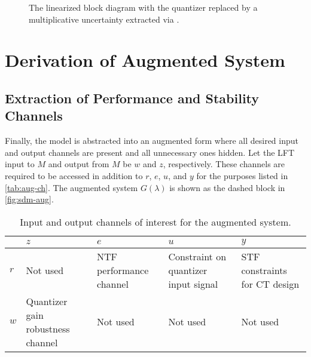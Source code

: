 \begin{figure}[h]
\begin{tikzpicture}[ampersand replacement=\&,scale=0.75, every node/.style={scale=0.75}]
	\end{tikzpicture}
	\caption{The linearized block diagram with the quantizer replaced by a multiplicative uncertainty extracted via .} \label{fig:sdm-stdf-lft}
\end{figure}

\section{Derivation of Augmented System}

\subsection{Extraction of Performance and Stability Channels}

Finally, the model is abstracted into an augmented form where all desired input and output channels are present and all unnecessary ones hidden. Let the \gls{LFT} input to $M$ and output from $M$ be $w$ and $z$, respectively. These channels are required to be accessed in addition to $r$, $e$, $u$, and $y$ for the purposes listed in \autoref{tab:aug-ch}. The augmented system $G(\lambda)$ is shown as the dashed block in \autoref{fig:sdm-aug}.

\begin{table}[t]
	\caption{Input and output channels of interest for the augmented system.} \label{tab:aug-ch}
	\begin{tabular}{l | >{\RaggedRight}p{2cm} >{\RaggedRight}p{2.25cm} >{\RaggedRight}p{2.25cm} >{\RaggedRight}p{2cm}}
		\toprule
		\diagbox[width=2cm, height=1cm]{\textbf{Input}}{\textbf{Output}} & $z$ & $e$ & $u$ & $y$ \\
		\midrule
		$r$ & Not used & \gls{NTF} performance channel & Constraint on quantizer input signal & \gls{STF} constraints for \gls{CT} design \\
		$w$ & Quantizer gain robustness channel & Not used & Not used & Not used \\
		\bottomrule
	\end{tabular}
\end{table}


